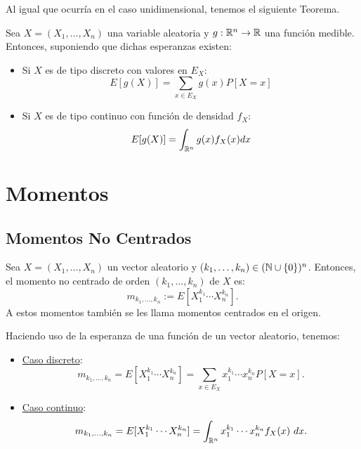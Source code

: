 Al igual que ocurría en el caso unidimensional, tenemos el siguiente Teorema.
\begin{teo}
    Sea $X=(X_1,\dots,X_n)$ una variable aleatoria y $g:\mathbb{R}^n\to \mathbb{R}$ una función medible. Entonces, suponiendo que dichas esperanzas existen:
    \begin{itemize}
        \item Si $X$ es de tipo discreto con valores en $E_X$:
        \begin{equation*}
            E[g(X)] = \sum_{x\in E_X}g(x)P[X=x]
        \end{equation*}

        \item Si $X$ es de tipo continuo con función de densidad $f_X$:
        \begin{equation*}
            E[g(X)] = \int_{\mathbb{R}^n} g(x)f_X(x) dx
        \end{equation*}
    \end{itemize}
\end{teo}

\section{Momentos}

\subsection{Momentos No Centrados}

\begin{definicion}
    Sea $X=(X_1,\dots,X_n)$ un vector aleatorio y ($k_1,\dots,k_n)\in (\mathbb{N}\cup \{0\})^n$. Entonces, el momento no centrado de orden $(k_1,\dots,k_n)$ de $X$ es:
    \begin{equation*}
        m_{k_1,\dots,k_n} := E[X_1^{k_1}\cdots X_n^{k_n}].
    \end{equation*}
    A estos momentos también se les llama momentos centrados en el origen.
\end{definicion}

Haciendo uso de la esperanza de una función de un vector aleatorio, tenemos:
\begin{itemize}
    \item \ul{Caso discreto}:
    \begin{equation*}
        m_{k_1,\dots,k_n}=E[X_1^{k_1}\cdots X_n^{k_n}] = \sum_{x\in E_X} x_1^{k_1}\cdots x_n^{k_n} P[X=x].
    \end{equation*}

    \item \ul{Caso continuo}:
    \begin{equation*}
        m_{k_1,\dots,k_n}=E[X_1^{k_1}\cdots X_n^{k_n}] = \int_{\mathbb{R}^n} x_1^{k_1}\cdots x_n^{k_n} f_X(x)~d x.
    \end{equation*}
\end{itemize}


